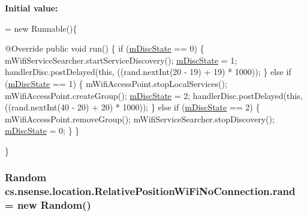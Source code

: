 {\bfseries Initial value\-:}
\begin{DoxyCode}
= \textcolor{keyword}{new} Runnable()\{

        @Override
        \textcolor{keyword}{public} \textcolor{keywordtype}{void} run() \{
            \textcolor{keywordflow}{if} (\hyperlink{classcs_1_1nsense_1_1location_1_1_relative_position_wi_fi_no_connection_a2e8e9aeb6f103368e34eba7f281994a2}{mDiscState} == 0) \{
                mWifiServiceSearcher.startServiceDiscovery();
                \hyperlink{classcs_1_1nsense_1_1location_1_1_relative_position_wi_fi_no_connection_a2e8e9aeb6f103368e34eba7f281994a2}{mDiscState} = 1;
                handlerDisc.postDelayed(\textcolor{keyword}{this}, ((rand.nextInt(20 - 19) + 19) * 1000));
            \} \textcolor{keywordflow}{else}  \textcolor{keywordflow}{if} (\hyperlink{classcs_1_1nsense_1_1location_1_1_relative_position_wi_fi_no_connection_a2e8e9aeb6f103368e34eba7f281994a2}{mDiscState} == 1) \{
                mWifiAccessPoint.stopLocalServices();
                mWifiAccessPoint.createGroup();
                \hyperlink{classcs_1_1nsense_1_1location_1_1_relative_position_wi_fi_no_connection_a2e8e9aeb6f103368e34eba7f281994a2}{mDiscState} = 2;
                handlerDisc.postDelayed(\textcolor{keyword}{this}, ((rand.nextInt(40 - 20) + 20) * 1000));
            \} \textcolor{keywordflow}{else} \textcolor{keywordflow}{if} (\hyperlink{classcs_1_1nsense_1_1location_1_1_relative_position_wi_fi_no_connection_a2e8e9aeb6f103368e34eba7f281994a2}{mDiscState} == 2) \{
                mWifiAccessPoint.removeGroup();
                mWifiServiceSearcher.stopDiscovery();
                \hyperlink{classcs_1_1nsense_1_1location_1_1_relative_position_wi_fi_no_connection_a2e8e9aeb6f103368e34eba7f281994a2}{mDiscState} = 0;
            \}
        \}
        
    \}
\end{DoxyCode}
\hypertarget{classcs_1_1nsense_1_1location_1_1_relative_position_wi_fi_no_connection_a4849efb8ccfe42411bb5a4f8232c6299}{
\subsubsection[{rand}]{\setlength{\rightskip}{0pt plus 5cm}Random cs.\-nsense.\-location.\-Relative\-Position\-Wi\-Fi\-No\-Connection.\-rand = new Random()\hspace{0.3cm}{\ttfamily [private]}}}\label{classcs_1_1nsense_1_1location_1_1_relative_position_wi_fi_no_connection_a4849efb8ccfe42411bb5a4f8232c6299}
